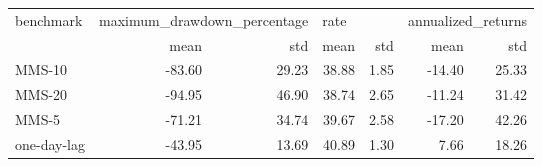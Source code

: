 \begin{tabular}{lrrrrrr}
\toprule
  benchmark & \multicolumn{2}{l}{maximum\_drawdown\_percentage} & \multicolumn{2}{l}{rate} & \multicolumn{2}{l}{annualized\_returns} \\
            &                        mean &   std &  mean &  std &               mean &   std \\
\midrule
     MMS-10 &                      -83.60 & 29.23 & 38.88 & 1.85 &             -14.40 & 25.33 \\
     MMS-20 &                      -94.95 & 46.90 & 38.74 & 2.65 &             -11.24 & 31.42 \\
      MMS-5 &                      -71.21 & 34.74 & 39.67 & 2.58 &             -17.20 & 42.26 \\
one-day-lag &                      -43.95 & 13.69 & 40.89 & 1.30 &               7.66 & 18.26 \\
\bottomrule
\end{tabular}
